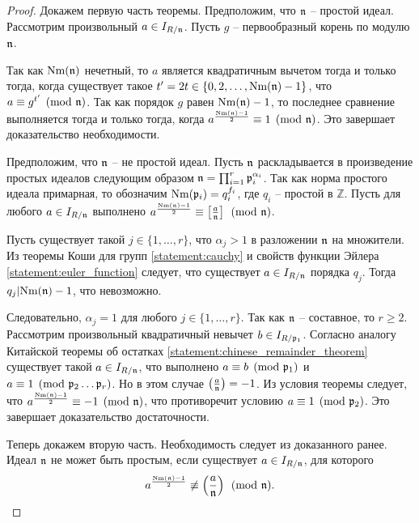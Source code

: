 \documentclass[_00_dissertation.tex]{subfiles}
\begin{document}
\begin{proof}
    Докажем первую часть теоремы.
    Предположим, что $\mathfrak{n}$ -- простой идеал.
    Рассмотрим произвольный $a \in I_{R/\mathfrak{n}}$.
    Пусть $g$ -- первообразный корень по модулю $\mathfrak{n}$.

    Так как $\textrm{Nm}(\mathfrak{n})$ нечетный, то $a$ является квадратичным вычетом тогда и только тогда, когда существует такое $t' = 2t \in \{0, 2, \dots, \textrm{Nm}(\mathfrak{n}) - 1\}$, что $a \equiv g^{t'} \pmod{\mathfrak{n}}$.
    Так как порядок $g$ равен $\textrm{Nm}(\mathfrak{n}) - 1$, то последнее сравнение выполняется тогда и только тогда, когда $a^{\frac{\textrm{Nm}(\mathfrak{n}) - 1}{2}} \equiv 1 \pmod{\mathfrak{n}}$.
    Это завершает доказательство необходимости.

    Предположим, что $\mathfrak{n}$ -- не простой идеал.
    Пусть $\mathfrak{n}$ раскладывается в произведение простых идеалов следующим образом $\mathfrak{n} = \prod_{i=1}^{r} \mathfrak{p}_i^{\alpha_i}$.
    Так как норма простого идеала примарная, то обозначим $\textrm{Nm}(\mathfrak{p}_i) = q_i^{f_i}$, где $q_i$ -- простой в $\mathbb{Z}$.
    Пусть для любого $a \in I_{R/\mathfrak{n}}$ выполнено $a^{\frac{\textrm{Nm}(\mathfrak{n}) - 1}{2}} \equiv \left[\frac{a}{\mathfrak{n}}\right] \pmod{\mathfrak{n}}$.

    Пусть существует такой $j \in \{1, \dots, r\}$, что $\alpha_j > 1$ в разложении $\mathfrak{n}$ на множители.
    Из теоремы Коши для групп \ref{statement:cauchy} и свойств функции Эйлера \ref{statement:euler_function} следует, что существует $a \in I_{R/\mathfrak{n}}$ порядка $q_j$.
    Тогда $q_j | \textrm{Nm}(\mathfrak{n}) - 1$, что невозможно.

    Следовательно, $\alpha_j = 1$ для любого $j \in \{1, \ldots, r\}$.
    Так как $\mathfrak{n}$ -- составное, то $r \ge 2$.
    Рассмотрим произвольный квадратичный невычет $b \in I_{R/\mathfrak{p}_1}$.
    Согласно аналогу Китайской теоремы об остатках \ref{statement:chinese_remainder_theorem} существует такой $a \in I_{R/\mathfrak{n}}$, что выполнено $a \equiv b \pmod{\mathfrak{p}_1}$ и $a \equiv 1 \pmod{\mathfrak{p}_2\dots\mathfrak{p}_r}$.
    Но в этом случае $\left(\frac{a}{\mathfrak{n}}\right) = -1$.
    Из условия теоремы следует, что $a^{\frac{\textrm{Nm}(\mathfrak{n}) - 1}{2}} \equiv -1 \pmod{\mathfrak{n}}$, что противоречит условию $a \equiv 1 \pmod{\mathfrak{p}_2}$.
    Это завершает доказательство достаточности.

    Теперь докажем вторую часть.
    Необходимость следует из доказанного ранее.
    Идеал $\mathfrak{n}$ не может быть простым, если существует $a \in I_{R/\mathfrak{n}}$, для которого
    \begin{equation*}
        a^{\frac{\textrm{Nm}(\mathfrak{n}) - 1}{2}} \not\equiv \left(\frac{a}{\mathfrak{n}}\right) \pmod{\mathfrak{n}}.
    \end{equation*}


\end{proof}
\end{document}

